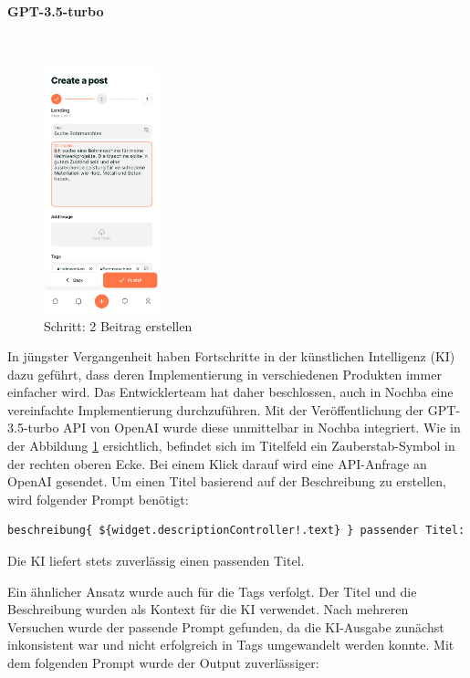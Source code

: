 \paragraph{GPT-3.5-turbo}\mbox{} \\


\begin{figure}[H]
  \centering
  \includegraphics[width=0.3\textwidth]{pics/create-post.png}
  \caption{Schritt: 2 Beitrag erstellen}
  \label{fig:createpost}
\end{figure}


In jüngster Vergangenheit haben Fortschritte in der künstlichen Intelligenz (KI) dazu geführt, dass deren Implementierung in verschiedenen Produkten immer einfacher wird. Das Entwicklerteam hat daher beschlossen, auch in Nochba eine vereinfachte Implementierung durchzuführen. Mit der Veröffentlichung der GPT-3.5-turbo API von OpenAI wurde diese unmittelbar in Nochba integriert. Wie in der Abbildung \ref{fig:createpost} ersichtlich, befindet sich im Titelfeld ein Zauberstab-Symbol in der rechten oberen Ecke. Bei einem Klick darauf wird eine API-Anfrage an OpenAI gesendet. Um einen Titel basierend auf der Beschreibung zu erstellen, wird folgender Prompt benötigt:
\begin{verbatim}
beschreibung{ ${widget.descriptionController!.text} } passender Titel:
\end{verbatim}

Die KI liefert stets zuverlässig einen passenden Titel.

Ein ähnlicher Ansatz wurde auch für die Tags verfolgt. Der Titel und die Beschreibung wurden als Kontext für die KI verwendet. Nach mehreren Versuchen wurde der passende Prompt gefunden, da die KI-Ausgabe zunächst inkonsistent war und nicht erfolgreich in Tags umgewandelt werden konnte. Mit dem folgenden Prompt wurde der Output zuverlässiger:

